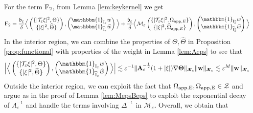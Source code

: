 \documentclass[11pt,reqno,a4paper]{amsart}
\def\eps{\varepsilon}
\newcommand{\cM}{\mathcal{M}}
\newcommand{\cT}{\mathcal{T}}
\newcommand{\cX}{\mathcal{X}}
\newcommand{\cZ}{\mathcal{Z}}
\newcommand{\app}{\mathrm{app}}
\newcommand{\1}{\mathbbm{1}}
\theoremstyle{definition}
\theoremstyle{definition}
\numberwithin{equation}{section}
\begin{document}
For the term ${\rm F}_2$,  from Lemma \ref{lem:keykernel} we get
\begin{align}
    {\rm F}_2=\frac{\mathfrak{b}_\eps}{\delta}\Big\langle\begin{pmatrix}
                \{|\cT_{\eps} \xi|^2,\Theta\}\\
                \{|\xi|^2,\widehat{\Theta}\}
            \end{pmatrix}, \begin{pmatrix}
                \mathbbm{1}_{{\rm I}_{\eps}} w\\
                \mathbbm{1}_{\widehat{{\rm I}}_{\eps}} \widehat{w}
\end{pmatrix}\Big\rangle+\frac{\mathfrak{b}_\eps}{\delta}\Big\langle\cM_{\eps} \begin{pmatrix}
                \{|\cT_{\eps} \xi|^2,\Omega_{\app,E}\}\\
                \{|\xi|^2,\widehat{\Omega}_{\app,E}\}
            \end{pmatrix}, \begin{pmatrix}
                \mathbbm{1}_{{\rm I}_{\eps}^c} w\\
                \mathbbm{1}_{\widehat{{\rm I}}_{\eps}^c} \widehat{w}
\end{pmatrix}\Big\rangle
\end{align}
In the interior region, we can combine the properties of $\Theta, \widehat{\Theta}$ in Proposition \ref{prop:functional} with properties of the weight in Lemma \ref{lem:Aeps} to see that 
\begin{align}
\Big|\Big\langle\begin{pmatrix}
                \{|\cT_{\eps} \xi|^2,\Theta\}\\
                \{|\xi|^2,\widehat{\Theta}\}
            \end{pmatrix}, \begin{pmatrix}
                \mathbbm{1}_{{\rm I}_{\eps}} w\\
                \mathbbm{1}_{\widehat{{\rm I}}_{\eps}} \widehat{w}
\end{pmatrix}\Big\rangle\Big|\lesssim \eps^{-1}\|\mathbf{A}_{\eps}^{-\frac12}(1+|\xi|)\nabla \boldsymbol{\Theta}\|_{\boldsymbol{\cX}_\eps}\|\mathbf w\|_{\boldsymbol{\cX}_{\eps}}\lesssim \eps^{M}\|\mathbf w\|_{\boldsymbol{\cX}_{\eps}}
\end{align}
Outside the interior region, we can exploit the fact that $\Omega_{\rm app,E},\Omega_{\rm app,E}\in \cZ$ and argue as in the proof of Lemma \ref{lem:MepsBeps} to exploit the exponential decay of $A_{\eps}^{-1}$ and handle the terms involving $\Delta^{-1}$ in $\cM_{\eps}$. Overall, we obtain that 
\end{document}

